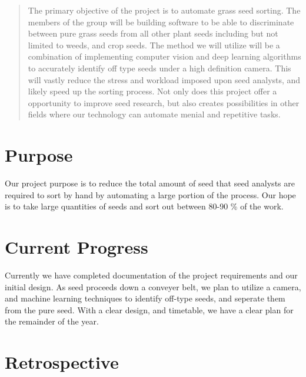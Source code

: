 \documentclass[onecolumn, draftclsnofoot,10pt, compsoc]{IEEEtran}
\begin{document}
\begin{titlepage}
\begin{singlespace}
\begin{abstract}
        	The primary objective of the project is to automate grass seed sorting. The members of the group will be building software to be able to discriminate between pure grass seeds from all other plant seeds including but not limited to weeds, and crop seeds. The method we will utilize will be a combination of implementing computer vision and deep learning algorithms to accurately identify off type seeds under a high definition camera. This will vastly reduce the stress and workload imposed upon seed analysts, and likely speed up the sorting process. Not only does this project offer a opportunity to improve seed research, but also creates possibilities in other fields where our technology can automate menial and repetitive tasks.
        \end{abstract}     
    \end{singlespace}
\end{titlepage}
\newpage
{}
\tableofcontents
\clearpage

\section{Purpose}
Our project purpose is to reduce the total amount of seed that seed analysts are required to sort by hand by automating a large portion of the process. Our hope is to take large quantities of seeds and sort out between 80-90 \% of the work.

\section{Current Progress}

Currently we have completed documentation of the project requirements and our initial design. As seed proceeds down a conveyer belt, we plan to utilize a camera, and machine learning techniques to identify off-type seeds, and seperate them from the pure seed. With a clear design, and timetable, we have a clear plan for the remainder of the year. 

\section{Retrospective}
\end{document}
